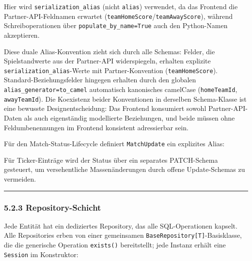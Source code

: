 Hier wird \texttt{serialization\_alias} (nicht \texttt{alias})
verwendet, da das Frontend die Partner-API-Feldnamen erwartet
(\texttt{teamHomeScore}/\texttt{teamAwayScore}), während
Schreiboperationen über \texttt{populate\_by\_name=True} auch den
Python-Namen akzeptieren.

Diese duale Alias-Konvention zieht sich durch alle Schemas: Felder, die
Spielstandwerte aus der Partner-API widerspiegeln, erhalten explizite
\texttt{serialization\_alias}-Werte mit Partner-Konvention
(\texttt{teamHomeScore}). Standard-Beziehungsfelder hingegen erhalten
durch den globalen \texttt{alias\_generator=to\_camel} automatisch
kanonisches camelCase (\texttt{homeTeamId}, \texttt{awayTeamId}). Die
Koexistenz beider Konventionen in derselben Schema-Klasse ist eine
bewusste Designentscheidung: Das Frontend konsumiert sowohl
Partner-API-Daten als auch eigenständig modellierte Beziehungen, und
beide müssen ohne Feldumbenennungen im Frontend konsistent adressierbar
sein.

Für den Match-Status-Lifecycle definiert \texttt{MatchUpdate} ein
explizites Alias:

\begin{Shaded}
\begin{Highlighting}[]
\OperatorTok{=}\OperatorTok{=}\NormalTok{)}
\end{Highlighting}
\end{Shaded}

Für Ticker-Einträge wird der Status über ein separates PATCH-Schema
gesteuert, um versehentliche Massenänderungen durch offene
Update-Schemas zu vermeiden.

\begin{center}\rule{0.5\linewidth}{0.5pt}\end{center}

\subsubsection{5.2.3 Repository-Schicht}\label{repository-schicht}

Jede Entität hat ein dediziertes Repository, das alle SQL-Operationen
kapselt. Alle Repositories erben von einer gemeinsamen
\texttt{BaseRepository{[}T{]}}-Basisklasse, die die generische Operation
\texttt{exists()} bereitstellt; jede Instanz erhält eine
\texttt{Session} im Konstruktor:

